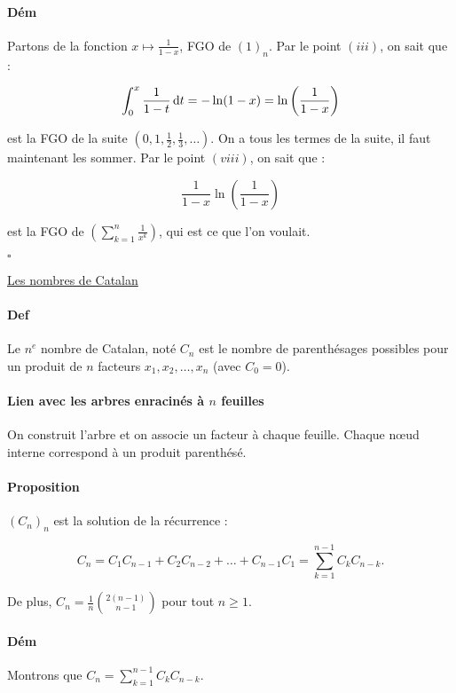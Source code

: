 \documentclass{article}
\begin{document}
			\paragraph{Dém} Partons de la fonction $x \mapsto \frac 1{1-x}$, FGO de $(1)_n$. Par le point $(iii)$, on sait que :

			\[\int_0^x\frac 1{1-t}\dif t = -\ln(1-x) = \ln\left(\frac 1{1-x}\right)\]

			est la FGO de la suite $\left(0, 1, \frac 12, \frac 13, \ldots\right)$. On a tous les termes de la suite, il faut maintenant les sommer. Par le point $(viii)$, on sait que :

			\[\frac 1{1-x}\ln\left(\frac 1{1-x}\right)\]

			est la FGO de $\left(\sum_{k=1}^n \frac 1{x^k}\right)$, qui est ce que l'on voulait.

			\begin{flushright}$\square$\end{flushright}

			\underline{Les nombres de Catalan}

			\paragraph{Def} Le $n^e$ nombre de Catalan, noté $C_n$ est le nombre de parenthésages possibles pour un produit de $n$ facteurs $x_1, x_2, \ldots, x_n$ (avec $C_0 = 0$).

			\paragraph{Lien avec les arbres enracinés à $n$ feuilles} On construit l'arbre et on associe un facteur à chaque feuille. Chaque nœud interne correspond à un produit parenthésé.

			\paragraph{Proposition} $\left(C_n\right)_n$ est la solution de la récurrence :

			\[C_n = C_1C_{n-1} + C_2C_{n-2} + \ldots + C_{n-1}C_1 = \sum_{k=1}^{n-1}C_kC_{n-k}.\]

			De plus, $C_n = \frac 1n\binom {2(n-1)}{n-1}$ pour tout $n \geq 1$.

			\paragraph{Dém} Montrons que $C_n = \sum_{k=1}^{n-1}C_kC_{n-k}$.
\end{document}
